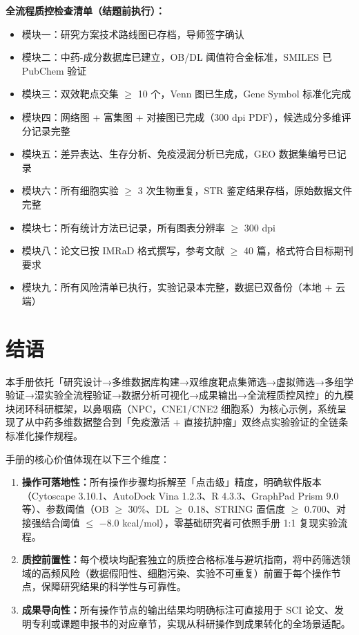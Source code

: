 \documentclass[12pt,a4paper,twoside]{article}
\begin{document}
\begin{qcbox}
\textbf{全流程质控检查清单（结题前执行）：}
\begin{itemize}
  \item 模块一：研究方案技术路线图已存档，导师签字确认 
  \item 模块二：中药-成分数据库已建立，OB/DL 阈值符合金标准，SMILES 已 PubChem 验证 
  \item 模块三：双效靶点交集 $\geq$ 10 个，Venn 图已生成，Gene Symbol 标准化完成 
  \item 模块四：网络图 + 富集图 + 对接图已完成（300 dpi PDF），候选成分多维评分记录完整 
  \item 模块五：差异表达、生存分析、免疫浸润分析已完成，GEO 数据集编号已记录 
  \item 模块六：所有细胞实验 $\geq$ 3 次生物重复，STR 鉴定结果存档，原始数据文件完整 
  \item 模块七：所有统计方法已记录，所有图表分辨率 $\geq$ 300 dpi 
  \item 模块八：论文已按 IMRaD 格式撰写，参考文献 $\geq$ 40 篇，格式符合目标期刊要求 
  \item 模块九：所有风险清单已执行，实验记录本完整，数据已双备份（本地 + 云端）
\end{itemize}
\end{qcbox}

\section*{结语}

本手册依托「研究设计→多维数据库构建→双维度靶点集筛选→虚拟筛选→多组学验证→湿实验全流程验证→数据分析可视化→成果输出→全流程质控风控」的九模块闭环科研框架，以鼻咽癌（NPC，CNE1/CNE2 细胞系）为核心示例，系统呈现了从中药多维数据整合到「免疫激活 + 直接抗肿瘤」双终点实验验证的全链条标准化操作规程。

手册的核心价值体现在以下三个维度：

\begin{enumerate}
  \item \textbf{操作可落地性：}所有操作步骤均拆解至「点击级」精度，明确软件版本（Cytoscape 3.10.1、AutoDock Vina 1.2.3、R 4.3.3、GraphPad Prism 9.0 等）、参数阈值（OB $\geq$ 30\%、DL $\geq$ 0.18、STRING 置信度 $\geq$ 0.700、对接强结合阈值 $\leq$ $-$8.0 kcal/mol），零基础研究者可依照手册 1:1 复现实验流程。

  \item \textbf{质控前置性：}每个模块均配套独立的质控合格标准与避坑指南，将中药筛选领域的高频风险（数据假阳性、细胞污染、实验不可重复）前置于每个操作节点，保障研究结果的科学性与可靠性。

  \item \textbf{成果导向性：}所有操作节点的输出结果均明确标注可直接用于 SCI 论文、发明专利或课题申报书的对应章节，实现从科研操作到成果转化的全场景适配。
\end{enumerate}
\end{document}
